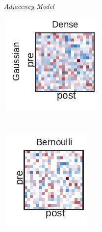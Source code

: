 \begin{figure}[t!]
  \centering
  \textit{~~~~~Adjacency Model} \\
  \hspace{1em}
  \begin{subfigure}[b]{1.25in}
    \centering
    \includegraphics[width=\textwidth]{figures/ch3/Dense-Gaussian.pdf}
  \end{subfigure}
  ~
  \begin{subfigure}[b]{1.10in}
    \centering
    \includegraphics[width=\textwidth]{figures/ch3/Bernoulli-Gaussian.pdf}

\end{subfigure}
\end{figure}
